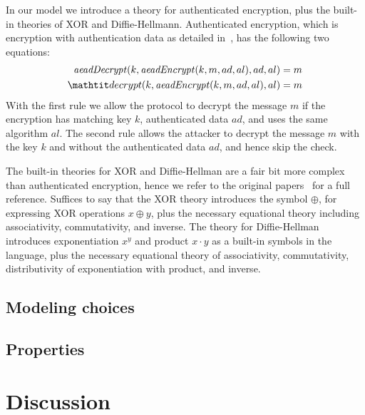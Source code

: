 \documentclass[runningheads]{llncs}
\begin{document}
In our model we introduce a theory for authenticated encryption, plus the built-in theories of XOR and Diffie-Hellmann.
Authenticated encryption, which is encryption with authentication data as detailed in~\cite{aead}, has the following two equations:
\begin{align*}
  \mAeadDecrypt(k, \mAeadEncrypt(k, m, ad, al), ad, al) = m\\
  \mDecrypt(k, \mAeadEncrypt(k, m, ad, al), al) = m
\end{align*}
With the first rule we allow the protocol to decrypt the message $m$ if the encryption has matching key $k$, authenticated data $ad$, and uses the same algorithm $al$.
The second rule allows the attacker to decrypt the message $m$ with the key $k$ and without the authenticated data $ad$, and hence skip the check.

The built-in theories for XOR and Diffie-Hellman are a fair bit more complex than authenticated encryption, hence we refer to the original papers~\cite{xorTamarin,dhTamarin} for a full reference.
Suffices to say that the XOR theory introduces the symbol $\oplus$, for expressing XOR operations $x \oplus y$, plus the necessary equational theory including associativity, commutativity, and inverse.
The theory for Diffie-Hellman introduces exponentiation $x^y$ and product $x \cdot y$ as a built-in symbols in the language, plus the necessary equational theory of associativity, commutativity, distributivity of exponentiation with product, and inverse.

\subsection{Modeling choices}

\subsection{Properties}

\section{Discussion}
\label{sec:discussion}
\end{document}
